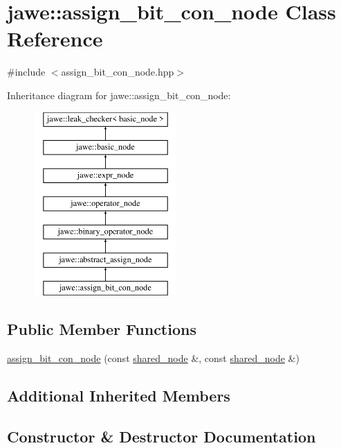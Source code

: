 \hypertarget{classjawe_1_1assign__bit__con__node}{}\section{jawe\+:\+:assign\+\_\+bit\+\_\+con\+\_\+node Class Reference}
\label{classjawe_1_1assign__bit__con__node}


{\ttfamily \#include $<$assign\+\_\+bit\+\_\+con\+\_\+node.\+hpp$>$}

Inheritance diagram for jawe\+:\+:assign\+\_\+bit\+\_\+con\+\_\+node\+:\begin{figure}[H]
\begin{center}
\leavevmode
\includegraphics[height=7.000000cm]{classjawe_1_1assign__bit__con__node}
\end{center}
\end{figure}
\subsection*{Public Member Functions}
\begin{DoxyCompactItemize}
\item 
\hyperlink{classjawe_1_1assign__bit__con__node_a2fb255b81a19da94587320ae64d06ded}{assign\+\_\+bit\+\_\+con\+\_\+node} (const \hyperlink{namespacejawe_a3f307481d921b6cbb50cc8511fc2b544}{shared\+\_\+node} \&, const \hyperlink{namespacejawe_a3f307481d921b6cbb50cc8511fc2b544}{shared\+\_\+node} \&)
\end{DoxyCompactItemize}
\subsection*{Additional Inherited Members}


\subsection{Constructor \& Destructor Documentation}
\mbox{\label{classjawe_1_1assign__bit__con__node_a2fb255b81a19da94587320ae64d06ded}} 
